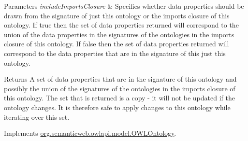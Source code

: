 \begin{DoxyParams}{Parameters}
{\em include\-Imports\-Closure} & Specifies whether data properties should be drawn from the signature of just this ontology or the imports closure of this ontology. If {\ttfamily true} then the set of data properties returned will correspond to the union of the data properties in the signatures of the ontologies in the imports closure of this ontology. If {\ttfamily false} then the set of data properties returned will correspond to the data properties that are in the signature of this just this ontology. \\
\hline
\end{DoxyParams}
\begin{DoxyReturn}{Returns}
A set of data properties that are in the signature of this ontology and possibly the union of the signatures of the ontologies in the imports closure of this ontology. The set that is returned is a copy -\/ it will not be updated if the ontology changes. It is therefore safe to apply changes to this ontology while iterating over this set. 
\end{DoxyReturn}


Implements \hyperlink{interfaceorg_1_1semanticweb_1_1owlapi_1_1model_1_1_o_w_l_ontology_ab67c6b9780e0c08cd33ba4fef973081a}{org.\-semanticweb.\-owlapi.\-model.\-O\-W\-L\-Ontology}.

